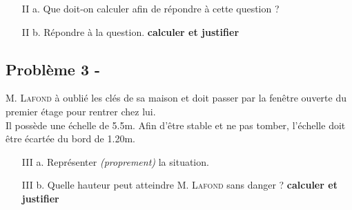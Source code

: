\documentclass[12pt]{article}
\begin{document}
\begin{enumerate}
  \item[II a.] Que doit-on calculer afin de répondre à cette question ?

  \item[II b.] Répondre à la question. \textbf{calculer et justifier}
\end{enumerate}

\subsection*{Problème 3 - }

\textsc{M. Lafond} à oublié les clés de sa maison et doit passer par la fenêtre ouverte du premier étage pour rentrer chez lui. \\
Il possède une échelle de 5.5m. Afin d'être stable et ne pas tomber, l'échelle doit être écartée du bord de 1.20m. 

\begin{enumerate}
\item[III a.] Représenter \textit{(proprement)} la situation.

\item[III b.] Quelle hauteur peut atteindre \textsc{M. Lafond} sans danger ?  \textbf{calculer et justifier}
\end{enumerate}
\end{document}
